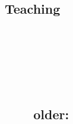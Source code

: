 \documentclass[margin,line,letterpaper]{resume}
\begin{document}
\begin{resume}



    \section{\mysidestyle Teaching\\~\\~\\~\\~\\~\\~~~~older:}


\end{resume}
\end{document}
